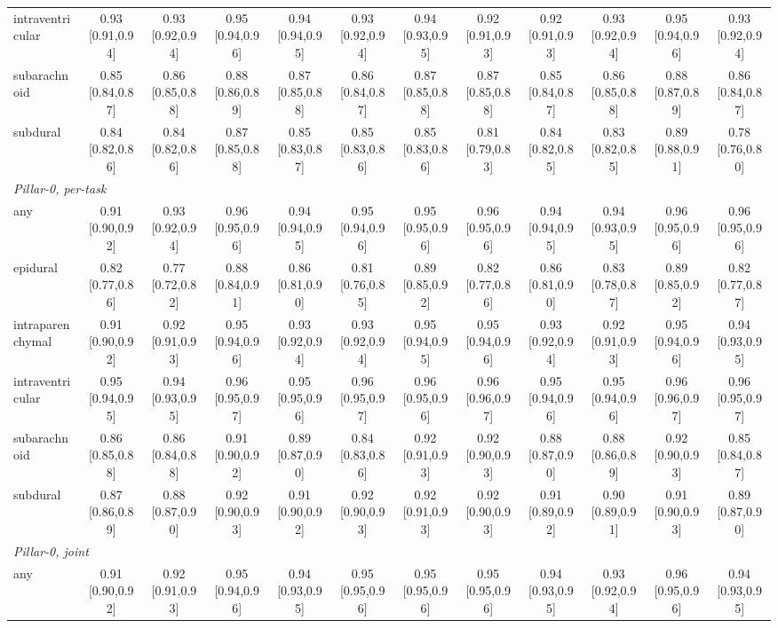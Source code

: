 \begin{tabular}{lccccccccccc}
intraventricular & 0.93 [0.91,0.94] & 0.93 [0.92,0.94] & 0.95 [0.94,0.96] & 0.94 [0.94,0.95] & 0.93 [0.92,0.94] & 0.94 [0.93,0.95] & 0.92 [0.91,0.93] & 0.92 [0.91,0.93] & 0.93 [0.92,0.94] & 0.95 [0.94,0.96] & 0.93 [0.92,0.94] \\
subarachnoid & 0.85 [0.84,0.87] & 0.86 [0.85,0.88] & 0.88 [0.86,0.89] & 0.87 [0.85,0.88] & 0.86 [0.84,0.87] & 0.87 [0.85,0.88] & 0.87 [0.85,0.88] & 0.85 [0.84,0.87] & 0.86 [0.85,0.88] & 0.88 [0.87,0.89] & 0.86 [0.84,0.87] \\
subdural & 0.84 [0.82,0.86] & 0.84 [0.82,0.86] & 0.87 [0.85,0.88] & 0.85 [0.83,0.87] & 0.85 [0.83,0.86] & 0.85 [0.83,0.86] & 0.81 [0.79,0.83] & 0.84 [0.82,0.85] & 0.83 [0.82,0.85] & 0.89 [0.88,0.91] & 0.78 [0.76,0.80] \\
\multicolumn{12}{l}{\textit{Pillar-0, per-task}} \\
any & 0.91 [0.90,0.92] & 0.93 [0.92,0.94] & 0.96 [0.95,0.96] & 0.94 [0.94,0.95] & 0.95 [0.94,0.96] & 0.95 [0.95,0.96] & 0.96 [0.95,0.96] & 0.94 [0.94,0.95] & 0.94 [0.93,0.95] & 0.96 [0.95,0.96] & 0.96 [0.95,0.96] \\
epidural & 0.82 [0.77,0.86] & 0.77 [0.72,0.82] & 0.88 [0.84,0.91] & 0.86 [0.81,0.90] & 0.81 [0.76,0.85] & 0.89 [0.85,0.92] & 0.82 [0.77,0.86] & 0.86 [0.81,0.90] & 0.83 [0.78,0.87] & 0.89 [0.85,0.92] & 0.82 [0.77,0.87] \\
intraparenchymal & 0.91 [0.90,0.92] & 0.92 [0.91,0.93] & 0.95 [0.94,0.96] & 0.93 [0.92,0.94] & 0.93 [0.92,0.94] & 0.95 [0.94,0.95] & 0.95 [0.94,0.96] & 0.93 [0.92,0.94] & 0.92 [0.91,0.93] & 0.95 [0.94,0.96] & 0.94 [0.93,0.95] \\
intraventricular & 0.95 [0.94,0.95] & 0.94 [0.93,0.95] & 0.96 [0.95,0.97] & 0.95 [0.95,0.96] & 0.96 [0.95,0.97] & 0.96 [0.95,0.96] & 0.96 [0.96,0.97] & 0.95 [0.94,0.96] & 0.95 [0.94,0.96] & 0.96 [0.96,0.97] & 0.96 [0.95,0.97] \\
subarachnoid & 0.86 [0.85,0.88] & 0.86 [0.84,0.88] & 0.91 [0.90,0.92] & 0.89 [0.87,0.90] & 0.84 [0.83,0.86] & 0.92 [0.91,0.93] & 0.92 [0.90,0.93] & 0.88 [0.87,0.90] & 0.88 [0.86,0.89] & 0.92 [0.90,0.93] & 0.85 [0.84,0.87] \\
subdural & 0.87 [0.86,0.89] & 0.88 [0.87,0.90] & 0.92 [0.90,0.93] & 0.91 [0.90,0.92] & 0.92 [0.90,0.93] & 0.92 [0.91,0.93] & 0.92 [0.90,0.93] & 0.91 [0.89,0.92] & 0.90 [0.89,0.91] & 0.91 [0.90,0.93] & 0.89 [0.87,0.90] \\
\multicolumn{12}{l}{\textit{Pillar-0, joint}} \\
any & 0.91 [0.90,0.92] & 0.92 [0.91,0.93] & 0.95 [0.94,0.96] & 0.94 [0.93,0.95] & 0.95 [0.95,0.96] & 0.95 [0.95,0.96] & 0.95 [0.95,0.96] & 0.94 [0.93,0.95] & 0.93 [0.92,0.94] & 0.96 [0.95,0.96] & 0.94 [0.93,0.95] \\

\end{tabular}
